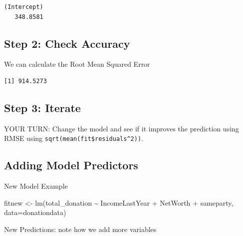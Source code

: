 \documentclass[
  letterpaper,
  DIV=11,
  numbers=noendperiod]{scrreprt}
\newenvironment{Shaded}{\begin{snugshade}}{\end{snugshade}}
\newcommand{\AttributeTok}[1]{\textcolor[rgb]{0.40,0.45,0.13}{#1}}
\newcommand{\DecValTok}[1]{\textcolor[rgb]{0.68,0.00,0.00}{#1}}
\newcommand{\FunctionTok}[1]{\textcolor[rgb]{0.28,0.35,0.67}{#1}}
\newcommand{\NormalTok}[1]{\textcolor[rgb]{0.00,0.23,0.31}{#1}}
\newcommand{\OtherTok}[1]{\textcolor[rgb]{0.00,0.23,0.31}{#1}}
\newcommand{\SpecialCharTok}[1]{\textcolor[rgb]{0.37,0.37,0.37}{#1}}
\begin{document}
\begin{verbatim}
(Intercept) 
   348.8581 
\end{verbatim}

\hypertarget{step-2-check-accuracy}{%
\subsection{Step 2: Check Accuracy}\label{step-2-check-accuracy}}

We can calculate the Root Mean Squared Error

\begin{Shaded}
\end{Shaded}

\begin{verbatim}
[1] 914.5273
\end{verbatim}

\hypertarget{step-3-iterate}{%
\subsection{Step 3: Iterate}\label{step-3-iterate}}

YOUR TURN: Change the model and see if it improves the prediction using
RMSE using \texttt{sqrt(mean(fit\$residuals\^{}2))}.

\hypertarget{adding-model-predictors}{%
\subsection{Adding Model Predictors}\label{adding-model-predictors}}

New Model Example

\begin{Shaded}
\begin{Highlighting}[]
\NormalTok{fitnew }\OtherTok{\textless{}{-}} \FunctionTok{lm}\NormalTok{(total\_donation }\SpecialCharTok{\textasciitilde{}}\NormalTok{ IncomeLastYear }\SpecialCharTok{+}\NormalTok{ NetWorth }\SpecialCharTok{+}\NormalTok{ sameparty, }
             \AttributeTok{data=}\NormalTok{donationdata)}
\end{Highlighting}
\end{Shaded}

New Predictions: note how we add more variables
\end{document}
